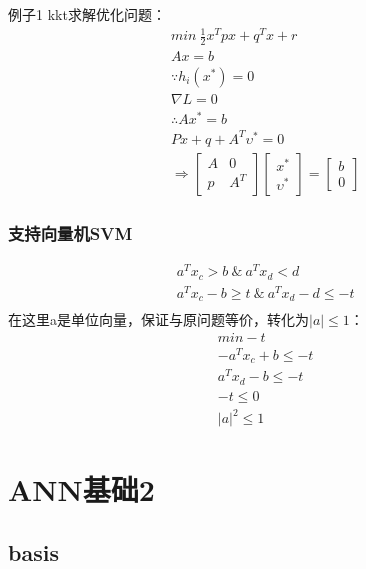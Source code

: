 \documentclass[UTF8]{article}
\begin{document}
例子1 kkt求解优化问题：
\begin{equation}
\begin{split}
&min\ \frac{1}{2}x^Tpx+q^Tx+r\\
&Ax=b\\
&\because h_i(x^*)=0\\
&\nabla L=0\\
&\therefore Ax^*=b\\
& Px+q+A^T \upsilon^*=0\\
&\Rightarrow \begin{bmatrix}
A &0\\ p& A^T
\end{bmatrix}
\begin{bmatrix}
x^* \\ \upsilon ^*
\end{bmatrix}=
\begin{bmatrix}
b\\0
\end{bmatrix}
\end{split}
\end{equation}

\subsubsection{支持向量机SVM}
\begin{equation}
\begin{split}
&a^Tx_c>b \ \& \ a^Tx_d<d\\
&a^Tx_c-b\geqslant t \ \& \ a^Tx_d-d\leqslant -t\\
\end{split}
\end{equation}
在这里a是单位向量，保证与原问题等价，转化为$|a|\leqslant1$：
\begin{equation}
    \begin{split}
    &min -t\\
    &-a^Tx_c+b\leqslant-t\\
    &a^Tx_d-b \leqslant -t\\
    &-t\leqslant0\\
    &|a|^2\leqslant1
    \end{split}
\end{equation}


\section{ANN基础2}

\subsection{basis}
\end{document}
